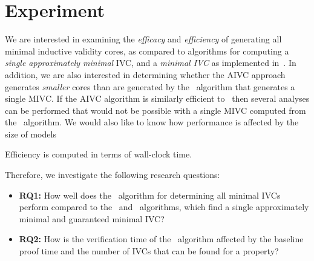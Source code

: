 \section{Experiment}
\label{sec:experiment}

\newcommand{\takeaway}[1]{
\vspace{6pt}
\noindent\fbox{\parbox{\textwidth}{#1}}
\vspace{6pt}
}
We are interested in examining the {\em efficacy} and {\em efficiency} of generating all minimal inductive validity cores, as compared to algorithms for computing a {\em single approximately minimal} IVC, and a {\em minimal IVC} as implemented in~\cite{Ghass16}.  In addition, we are also interested in determining whether the AIVC approach generates {\em smaller} cores than are generated by the \ucbfalg\ algorithm that generates a single MIVC.  If the AIVC algorithm is similarly efficient to \ucbfalg\ then several analyses can be performed that would not be possible with a single MIVC computed from the \ucbfalg\ algorithm.  We would also like to know how performance is affected by the size of models 

Efficiency is computed in terms of wall-clock time.

Therefore, we investigate the following research questions:
\begin{itemize}
  \item \textbf{RQ1:} How well does the \aivcalg ~algorithm for determining all minimal IVCs perform compared to the \ucalg ~and \ucbfalg ~algorithms, which find a single approximately minimal and guaranteed minimal IVC?
  \item \textbf{RQ2:} How is the verification time of the \aivcalg ~algorithm affected by the baseline proof time and the number of IVCs that can be found for a property?
%
\end{itemize}

 
